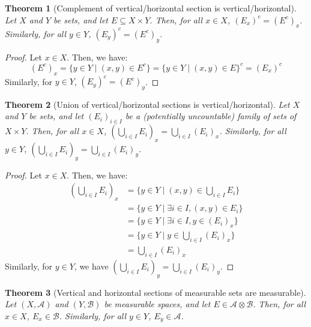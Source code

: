 \documentclass{article}
\newtheorem{theorem}{Theorem}[section]
\theoremstyle{definition}
\theoremstyle{remark}
\theoremstyle{example}
\theoremstyle{notation}
\theoremstyle{axiom}
\begin{document}
\begin{theorem}[Complement of vertical/horizontal section is vertical/horizontal] \label{thm:complement-section-is-section}
		Let $X$ and $Y$ be sets, and let $E \subseteq X \times Y$. Then, for all $x \in X$, $(E_x)^c = (E^c)_x$. Similarly, for all $y \in Y$, $(E_y)^c = (E^c)_y$.
\end{theorem}

\begin{proof}
		Let $x \in X$. Then, we have:
				$$(E^c)_x = \{y \in Y \mid (x, y) \in E^c\} = \{y \in Y \mid (x, y) \in E\}^c = (E_x)^c$$
		Similarly, for $y \in Y$, $(E_y)^c = (E^c)_y$.
\end{proof}

\begin{theorem}[Union of vertical/horizontal sections is vertical/horizontal] \label{thm:union-section-is-section}
		Let $X$ and $Y$ be sets, and let $(E_i)_{i \in I}$ be a (potentially uncountable) family of sets of $X \times Y$. Then, for all $x \in X$, $(\bigcup_{i \in I} E_i)_x = \bigcup_{i \in I} (E_i)_x$. Similarly, for all $y \in Y$, $(\bigcup_{i \in I} E_i)_y = \bigcup_{i \in I} (E_i)_y$.
\end{theorem}

\begin{proof}
		Let $x \in X$. Then, we have:
		\begin{align*}
								(\bigcup_{i \in I} E_i)_x &= \{y \in Y \mid (x, y) \in \bigcup_{i \in I} E_i\}\\
														  &= \{y \in Y \mid \exists i \in I, (x, y) \in E_i\}\\
														  &= \{y \in Y \mid \exists i \in I, y \in (E_i)_x\}\\
														  &= \{y \in Y \mid y \in \bigcup_{i \in I} (E_i)_x\}\\
														  &= \bigcup_{i \in I} (E_i)_x
		\end{align*}
		Similarly, for $y \in Y$, we have $(\bigcup_{i \in I} E_i)_y = \bigcup_{i \in I} (E_i)_y$.
\end{proof}

\begin{theorem}[Vertical and horizontal sections of measurable sets are measurable] \label{thm:vertical-section-measurable-set-is-measurable} %
		Let $(X, \mathcal{A})$ and $(Y, \mathcal{B})$ be measurable spaces, and let $E \in \mathcal{A} \otimes \mathcal{B}$. Then, for all $x \in X$, $E_x \in \mathcal{B}$. Similarly, for all $y \in Y$, $E_y \in \mathcal{A}$.
\end{theorem}
\end{document}
